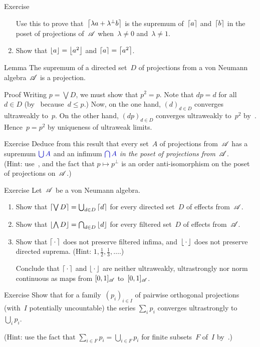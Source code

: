 \documentclass[a]{subfiles}
\begin{document}
\begin{parsec}
\begin{point}{Exercise}
\begin{enumerate}
Use this to prove that~$\left\lceil\lambda a+\lambda^\perp b\right\rceil$
is the supremum of~$\left\lceil a\right\rceil$ and~$\left\lceil b\right\rceil$
in the poset of projections of~$\mathscr{A}$
when~$\lambda\neq 0$ and~$\lambda\neq 1$.
\item
Show that $\left\lfloor a\right\rfloor=\left\lfloor a^2\right\rfloor$
and $\left\lceil a\right\rceil=\left\lceil a^2\right\rceil$.
\end{enumerate}
\end{point}
\begin{point}{Lemma}%
The supremum of a directed set~$D$ of projections
from a von Neumann algebra~$\mathscr{A}$ is a projection.
\begin{point}{Proof}%
Writing $p=\bigvee D$,
we must show that $p^2=p$.
Note that $dp=d$ for all~$d\in D$
(by~ because~$d\leq p$.)
Now, on the one hand, $(d)_{d\in D}$
converges ultraweakly to~$p$.
On the other hand,
$(dp)_{d\in D}$
converges ultraweakly to~$p^2$ by~.
Hence~$p=p^2$ by uniqueness of ultraweak limits.
\end{point}
\end{point}
\begin{point}{Exercise}%
Deduce from this result
 that every set~$A$ of projections from~$\mathscr{A}$
has a supremum $\Define{\bigcup A}$
and an infimum $\Define{\bigcap A}$
\emph{in the poset of projections from~$\mathscr{A}$}.\\
(Hint: use~,
and the fact that $p\mapsto p^\perp$ 
is an order anti-isomorphism on the poset of projections on~$\mathscr{A}$.)
\end{point}
\begin{point}{Exercise}
Let~$\mathscr{A}$ be a von Neumann algebra.
\begin{enumerate}
\item
Show that $\left\lceil\bigvee D\right\rceil=\bigcup_{d\in D} \left\lceil d\right\rceil$
for every directed set~$D$ of effects from~$\mathscr{A}$.
\item
Show that $\left\lfloor\bigwedge D\right\rfloor = \bigcap_{d\in D} \left\lfloor d\right\rfloor$
for every filtered set~$D$ of effects from~$\mathscr{A}$.
\item
Show that $\left\lceil\,\cdot\,\right\rceil$
does not preserve filtered infima,
and~$\left\lfloor\,\cdot\,\right\rfloor$
does not preserve directed suprema.
(Hint: $1,\frac{1}{2},\frac{1}{3},\dotsc$.)

Conclude that $\left\lceil\,\cdot\,\right\rceil$
and $\left\lfloor\,\cdot\,\right\rfloor$
are neither ultraweakly, ultrastrongly nor norm  continuous
as maps from $[0,1]_{\mathscr{A}}$ to~$[0,1]_{\mathscr{A}}$.
\end{enumerate}
\end{point}
\begin{point}{Exercise}%
Show that for a family~$(p_i)_{i\in I}$ 
of pairwise orthogonal projections
(with~$I$ potentially uncountable)
the series $\sum_i p_i$
converges ultrastrongly to~$\bigcup_i p_i$.

(Hint: 
use the fact that $\sum_{i\in F} p_i = \bigcup_{i \in F} p_i$
for finite subsets~$F$ of~$I$ by~.)
\end{point}
\end{parsec}
\end{document}
